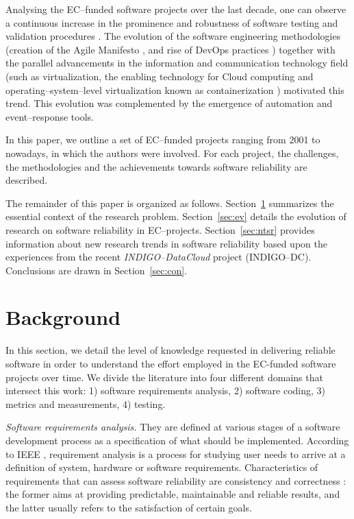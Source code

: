 \documentclass[journal]{IEEEtran}
\begin{document}
Analysing the EC--funded software projects over the last decade,
one can observe a continuous increase in the prominence and robustness of software
testing and validation procedures \cite{aiftimiei}. The
evolution of the software engineering methodologies (creation of the Agile
Manifesto \cite{agile-manifesto}, and rise of DevOps practices \cite{zhu}) together
with the parallel advancements in the information and communication technology
field (such as virtualization, the enabling technology for Cloud computing and
operating--system--level virtualization known as containerization \cite{soltesz}) motivated this trend.
This evolution was complemented by the emergence of automation and event--response tools.

In this paper, we outline a set of EC--funded projects
ranging from 2001 to nowadays, in which the authors were involved.
For each project, the challenges, the methodologies and
the achievements towards software reliability are described.

The remainder of this paper is
organized as follows. Section~\ref{sec:b} summarizes the essential context of the research problem.
Section~\ref{sec:ev} details the evolution of research on
software reliability in EC--projects. Section~\ref{sec:ntsr} provides
information about new research trends in software reliability based upon the
experiences from the recent {\sl INDIGO--DataCloud} project (INDIGO--DC).
Conclusions are drawn in Section~\ref{sec:con}.

\section{Background}
\label{sec:b}

In this section, we detail the level of knowledge requested in delivering reliable software in order
to understand the effort employed in the EC-funded software projects over time. We divide the literature
into four different domains that intersect this work: 1) software requirements analysis, 2) software
coding,
3) metrics and measurements, 4) testing.

\emph{Software requirements analysis.} They are defined at various stages of a software development process
as a specification of what should be implemented. According to IEEE \cite{radatz}, requirement
analysis is a process for studying user needs to arrive at a definition of system, hardware or software
requirements. Characteristics of requirements that can assess software reliability are consistency and
correctness \cite{sommerville}: the former aims at providing predictable, maintainable and reliable
results, and the latter usually refers to the satisfaction of certain goals.
\end{document}

